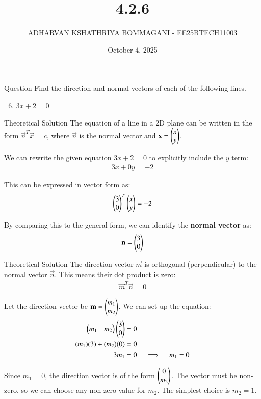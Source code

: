 \documentclass{beamer}
\title{4.2.6}
\date{October 4, 2025}
\author{ADHARVAN KSHATHRIYA BOMMAGANI - EE25BTECH11003}
\begin{document}
\frame{\titlepage}

\begin{frame}{Question}
Find the direction and normal vectors of each of the following lines.
\begin{enumerate}[label=\textbf{4.2.\arabic*}]
    \setcounter{enumi}{5}
    \item $3x+2 = 0$
\end{enumerate}
\end{frame}

\begin{frame}{Theoretical Solution}
The equation of a line in a 2D plane can be written in the form $\vec{n}^T \vec{x} = c$, where $\vec{n}$ is the normal vector and $\mathbf{x} = \begin{pmatrix} x \\ y \end{pmatrix}$.



We can rewrite the given equation $3x+2=0$ to explicitly include the $y$ term:
\begin{align*}
3x + 0y = -2
\end{align*}

This can be expressed in vector form as:
\begin{align*}
\begin{pmatrix} 3 \\ 0 \end{pmatrix}^T \begin{pmatrix} x \\ y \end{pmatrix} = -2
\end{align*}

By comparing this to the general form, we can identify the \textbf{normal vector} as:
\begin{align*}
\mathbf{n} = \begin{pmatrix} 3 \\ 0 \end{pmatrix}
\end{align*}
\end{frame}

\begin{frame}{Theoretical Solution}
The direction vector $\vec{m}$ is orthogonal (perpendicular) to the normal vector $\vec{n}$. This means their dot product is zero:
\begin{align*}
\vec{m}^T \vec{n} = 0
\end{align*}

Let the direction vector be $\mathbf{m} = \begin{pmatrix} m_1 \\ m_2 \end{pmatrix}$. We can set up the equation:
\begin{align*}
\begin{pmatrix} m_1 & m_2 \end{pmatrix} \begin{pmatrix} 3 \\ 0 \end{pmatrix} &= 0 \\
(m_1)(3) + (m_2)(0) &= 0 \\
3m_1 &= 0 \quad \implies \quad m_1 = 0
\end{align*}

Since $m_1 = 0$, the direction vector is of the form $\begin{pmatrix} 0 \\ m_2 \end{pmatrix}$. The vector must be non-zero, so we can choose any non-zero value for $m_2$. The simplest choice is $m_2 = 1$.
\end{frame}
\end{document}
